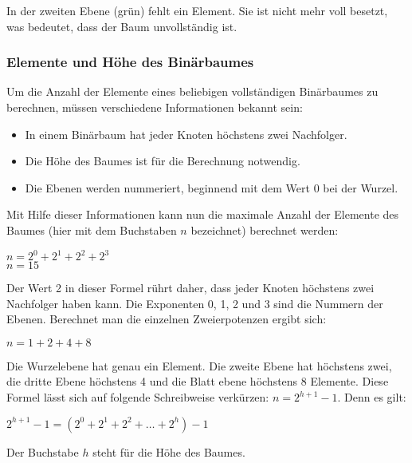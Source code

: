           In der zweiten Ebene (gr\"un) fehlt ein Element. Sie ist nicht mehr
          voll besetzt, was bedeutet, dass der Baum unvollst\"andig ist.
        \subsubsection{Elemente und H\"ohe des Bin\"arbaumes}
          Um die Anzahl der Elemente eines beliebigen vollst\"andigen
          Bin\"arbaumes zu berechnen, m\"ussen verschiedene Informationen
          bekannt sein:
          \begin{itemize}
            \item In einem Bin\"arbaum hat jeder Knoten h\"ochstens zwei
            Nachfolger.
            \item Die H\"ohe des Baumes ist f\"ur die Berechnung notwendig.
            \item Die Ebenen werden nummeriert, beginnend mit dem Wert 0 bei der
            Wurzel.
          \end{itemize}
          Mit Hilfe dieser Informationen kann nun die maximale Anzahl der
          Elemente des Baumes (hier mit dem Buchstaben $n$ bezeichnet) berechnet
          werden:
          \begin{center}
            $ n = 2^0 + 2^1 + 2^2 + 2^3$ \\
            $ n = 15$
          \end{center}
          Der Wert 2 in dieser Formel r\"uhrt daher, dass jeder Knoten
          h\"ochstens zwei Nachfolger haben kann. Die Exponenten 0, 1, 2 und 3
          sind die Nummern der Ebenen. Berechnet man die einzelnen
          Zweierpotenzen ergibt sich:
          \begin{center}
          $ n= 1 + 2 + 4 + 8$
          \end{center}
          Die Wurzelebene hat genau ein Element. Die zweite Ebene hat
          h\"ochstens zwei, die dritte Ebene h\"ochstens 4 und die Blatt ebene
          h\"ochstens 8 Elemente. Diese Formel l\"asst sich auf folgende
          Schreibweise verk\"urzen: $n = 2^{h + 1} - 1$. Denn es gilt:
          \begin{center}
          $ 2^{h+1}-1 = (2^0 + 2^1 + 2^2 + \dots + 2^h) - 1$
          \end{center}
          Der Buchstabe $h$ steht f\"ur die H\"ohe des Baumes.

